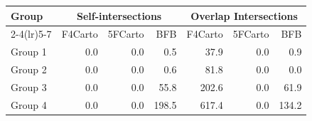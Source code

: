 
\begin{tabular}{lrrr|rrr}
\toprule
\multirow{2}{*}{Group} & \multicolumn{3}{c}{Self-intersections} & \multicolumn{3}{c}{Overlap Intersections} \\
\cmidrule(lr){2-4}\cmidrule(lr){5-7}
                   & F4Carto & 5FCarto & BFB & F4Carto & 5FCarto & BFB \\
\midrule

Group 1 &                         0.0 &                         0.0 &                            0.5 &                           37.9 &                            0.0 &                               0.9 \\
Group 2 &                         0.0 &                         0.0 &                            0.6 &                           81.8 &                            0.0 &                               0.0 \\
Group 3 &                         0.0 &                         0.0 &                           55.8 &                          202.6 &                            0.0 &                              61.9 \\
Group 4 &                         0.0 &                         0.0 &                          198.5 &                          617.4 &                            0.0 &                             134.2 \\
\bottomrule
\end{tabular}
